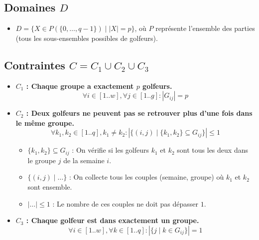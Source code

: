 \documentclass{article}
\begin{document}
\subsection*{Domaines $D$}

\begin{itemize}[label=\textbullet]
    \item $D = \{X \in P(\{0, \ldots, q-1\}) \mid |X| = p\}$, \newline
          o\`u $P$ repr\'esente l'ensemble des parties (tous les sous-ensembles possibles de golfeurs).
\end{itemize}

\subsection*{Contraintes $C = C_1 \cup C_2 \cup C_3$}

\begin{itemize}[label=\textbullet]
    \item \textbf{$C_1$ : Chaque groupe a exactement $p$ golfeurs.}
          \[ \forall i \in [1..w], \forall j \in [1..g] : |G_{ij}| = p \]
    \item \textbf{$C_2$ : Deux golfeurs ne peuvent pas se retrouver plus d'une fois dans le m\^eme groupe.}
          \[ \forall k_1, k_2 \in [1..q], k_1 \neq k_2 : |\{(i, j) \mid \{k_1, k_2\} \subseteq G_{ij}\}| \leq 1 \]
          \begin{itemize}[label=\textendash]
              \item $\{k_1, k_2\} \subseteq G_{ij}$ : On v\'erifie si les golfeurs $k_1$ et $k_2$ sont tous les deux dans le groupe $j$ de la semaine $i$.
              \item $\{(i, j) \mid \dots\}$ : On collecte tous les couples (semaine, groupe) o\`u $k_1$ et $k_2$ sont ensemble.
              \item $|\dots| \leq 1$ : Le nombre de ces couples ne doit pas d\'epasser $1$.
          \end{itemize}
    \item \textbf{$C_3$ : Chaque golfeur est dans exactement un groupe.}
          \[ \forall i \in [1..w], \forall k \in [1..q] : |\{j \mid k \in G_{ij}\}| = 1 \]
\end{itemize}
\end{document}

